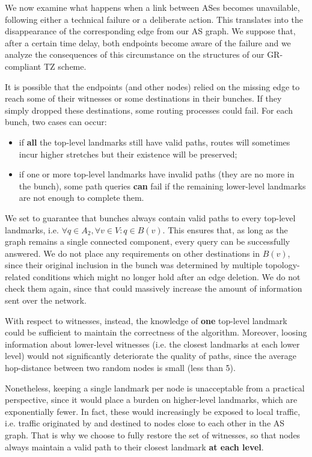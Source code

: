 \documentclass[a4paper,11pt,oneside]{report}
\begin{document}
We now examine what happens when a link between ASes becomes unavailable, following either a technical failure or a deliberate action. This translates into the disappearance of the corresponding edge from our AS graph. We suppose that, after a certain time delay, both endpoints become aware of the failure and we analyze the consequences of this circumstance on the structures of our GR-compliant TZ scheme.

\bigskip
It is possible that the endpoints (and other nodes) relied on the missing edge to reach some of their witnesses or some destinations in their bunches. If they simply dropped these destinations, some routing processes could fail.
For each bunch, two cases can occur:
\begin{itemize}
\item if \textbf{all} the top-level landmarks still have valid paths, routes will sometimes incur higher stretches but their existence will be preserved;
\item if one or more top-level landmarks have invalid paths (they are no more in the bunch), some path queries \textbf{can} fail if the remaining lower-level landmarks are not enough to complete them.
\end{itemize}
We set to guarantee that bunches always contain valid paths to every top-level landmarks, i.e. $\forall q \in A_2, \forall v \in V:q \in B(v)$. This ensures that, as long as the graph remains a single connected component, every query can be successfully answered. We do not place any requirements on other destinations in $B(v)$, since their original inclusion in the bunch was determined by multiple topology-related conditions which might no longer hold after an edge deletion. We do not check them again, since that could massively increase the amount of information sent over the network.

\bigskip
With respect to witnesses, instead, the knowledge of \textbf{one} top-level landmark could be sufficient to maintain the correctness of the algorithm. Moreover, loosing information about lower-level witnesses (i.e. the closest landmarks at each lower level) would not significantly deteriorate the quality of paths, since the average hop-distance between two random nodes is small \cite{krioukovCompactRoutingInternet2007} (less than 5).

Nonetheless, keeping a single landmark per node is unacceptable from a practical perspective, since it would place a burden on higher-level landmarks, which are exponentially fewer. In fact, these would increasingly be exposed to local traffic, i.e. traffic originated by and destined to nodes close to each other in the AS graph. That is why we choose to fully restore the set of witnesses, so that nodes always maintain a valid path to their closest landmark \textbf{at each level}.
\end{document}
